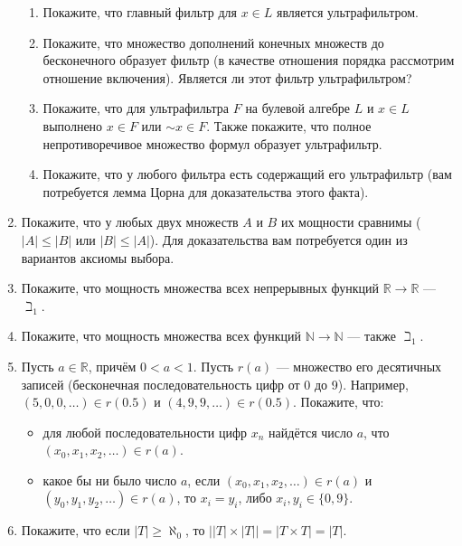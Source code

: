 \documentclass[10pt,a4paper,oneside]{article}
\begin{document}
\begin{enumerate}
\begin{enumerate}
\item Покажите, что главный фильтр для $x \in L$ является ультрафильтром.
\item Покажите, что множество дополнений конечных множеств до бесконечного образует фильтр (в качестве отношения порядка рассмотрим
отношение включения). Является ли этот фильтр ультрафильтром?
\item Покажите, что для ультрафильтра $F$ на булевой алгебре $L$ и $x \in L$ выполнено $x \in F$ или $\sim x \in F$. Также покажите,
что полное непротиворечивое множество формул образует ультрафильтр.
\item Покажите, что у любого фильтра есть содержащий его ультрафильтр (вам потребуется лемма Цорна для доказательства этого факта).
\end{enumerate}
\item Покажите, что у любых двух множеств $A$ и $B$ их мощности сравнимы ($|A| \le |B|$ или $|B| \le |A|$).
Для доказательства вам потребуется один из вариантов аксиомы выбора.
\item Покажите, что мощность множества всех непрерывных функций $\mathbb{R}\rightarrow\mathbb{R}$ --- $\beth_1$.
\item Покажите, что мощность множества всех функций $\mathbb{N}\rightarrow\mathbb{N}$ --- также $\beth_1$.

\item Пусть $a \in \mathbb{R}$, причём $0 < a < 1$. 
Пусть $r(a)$ --- множество его десятичных записей (бесконечная последовательность цифр от 0 до 9).
Например, $(5,0,0,\dots) \in r(0.5)$ и $(4,9,9,\dots) \in r(0.5)$.
Покажите, что:
\begin{itemize}
\item для любой последовательности цифр $x_n$ найдётся число $a$, что $(x_0, x_1, x_2, \dots) \in r(a)$.
\item какое бы ни было число $a$, если $(x_0, x_1, x_2,\dots) \in r(a)$ и
$(y_0, y_1, y_2,\dots) \in r(a)$, то $x_i = y_i$, либо $x_i, y_i \in \{0,9\}$.
\end{itemize}

\item Покажите, что если $|T| \ge \aleph_0$, то $\big||T|\times|T|\big| = |T\times T| = |T|$.
\end{enumerate}
\end{document}
